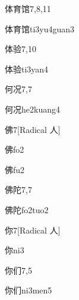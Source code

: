 \begin{entry}{体育馆}{7,8,11}
  \begin{phonetics}{体育馆}{ti3yu4guan3}
  \end{phonetics}
\end{entry}

\begin{entry}{体验}{7,10}
  \begin{phonetics}{体验}{ti3yan4}
  \end{phonetics}
\end{entry}

\begin{entry}{何况}{7,7}
  \begin{phonetics}{何况}{he2kuang4}
  \end{phonetics}
\end{entry}

\begin{entry}{佛}{7}[Radical 人]
  \begin{phonetics}{佛}{fo2}
  \end{phonetics}
  \begin{phonetics}{佛}{fu2}
  \end{phonetics}
\end{entry}

\begin{entry}{佛陀}{7,7}
  \begin{phonetics}{佛陀}{fo2tuo2}
  \end{phonetics}
\end{entry}

\begin{entry}{你}{7}[Radical 人]
  \begin{phonetics}{你}{ni3}
  \end{phonetics}
\end{entry}

\begin{entry}{你们}{7,5}
  \begin{phonetics}{你们}{ni3men5}
  \end{phonetics}
\end{entry}

